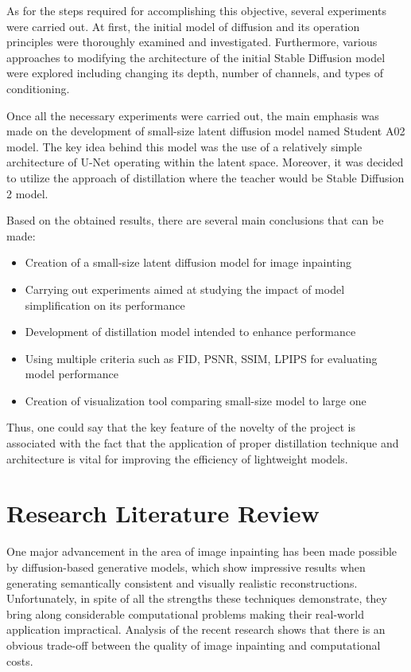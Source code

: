 \documentclass[journal]{IEEEtran}
\begin{document}
As for the steps required for accomplishing this objective, several experiments were carried out. At first, the initial model of diffusion and its operation principles were thoroughly examined and investigated. Furthermore, various approaches to modifying the architecture of the initial Stable Diffusion model were explored including changing its depth, number of channels, and types of conditioning.

Once all the necessary experiments were carried out, the main emphasis was made on the development of small-size latent diffusion model named Student A02 model. The key idea behind this model was the use of a relatively simple architecture of U-Net operating within the latent space. Moreover, it was decided to utilize the approach of distillation where the teacher would be Stable Diffusion 2 model.

Based on the obtained results, there are several main conclusions that can be made:
\begin{itemize}
  \item Creation of a small-size latent diffusion model for image inpainting
  \item Carrying out experiments aimed at studying the impact of model simplification on its performance
  \item Development of distillation model intended to enhance performance
  \item Using multiple criteria such as FID, PSNR, SSIM, LPIPS for evaluating model performance
  \item Creation of visualization tool comparing small-size model to large one
\end{itemize}
Thus, one could say that the key feature of the novelty of the project is associated with the fact that the application of proper distillation technique and architecture is vital for improving the efficiency of lightweight models.

\section{Research Literature Review}
One major advancement in the area of image inpainting has been made possible by diffusion-based generative models, which show impressive results when generating semantically consistent and visually realistic reconstructions. Unfortunately, in spite of all the strengths these techniques demonstrate, they bring along considerable computational problems making their real-world application impractical. Analysis of the recent research shows that there is an obvious trade-off between the quality of image inpainting and computational costs.
\end{document}
